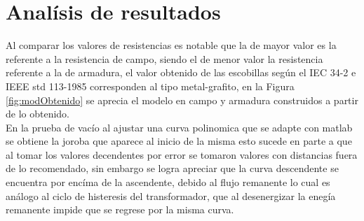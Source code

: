 \documentclass[11pt,letterpaper]{article}     %
\begin{document}
\section{Analísis de resultados}
Al comparar los valores de resistencias es notable que la de mayor valor es la referente a la resistencia de campo, siendo el de menor valor la resistencia referente a la de armadura, el valor obtenido de las escobillas según el IEC 34-2 e IEEE std 113-1985 corresponden al tipo metal-grafito, en la Figura \ref{fig:modObtenido} se aprecia el modelo en campo y armadura construidos a partir de lo obtenido.\\

En la prueba de vacío al ajustar una curva polinomica que se adapte con matlab se obtiene la joroba que aparece al inicio de la misma esto sucede en parte a que al tomar los valores decendentes por error se tomaron valores con distancias fuera de lo recomendado, sin embargo se logra apreciar que la curva descendente se encuentra por encíma de la ascendente, debido al flujo remanente lo cual es análogo al ciclo de histeresis del transformador, que al desenergizar la enegía remanente impide que se regrese por la misma curva.

    
\end{document}
